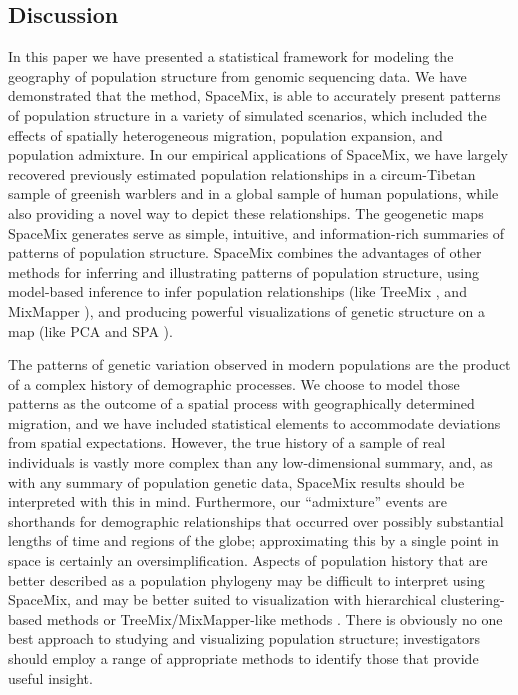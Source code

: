 \documentclass[12pt]{article}
\begin{document}
\subsection*{Discussion}
In this paper we have presented a statistical framework for modeling the geography of population structure from genomic sequencing data.
We have demonstrated that the method, SpaceMix, is able to accurately present patterns of population structure in a variety of simulated scenarios, which included the effects of spatially heterogeneous migration, population expansion, and population admixture.  In our empirical applications of SpaceMix, we have largely recovered previously estimated population relationships in a circum-Tibetan sample of greenish warblers and in a global sample of human populations, while also providing a novel way to depict these relationships.  The geogenetic maps SpaceMix generates serve as simple, intuitive, and information-rich summaries of patterns of population structure. 
SpaceMix combines the advantages of other methods for inferring and illustrating patterns of population structure, 
using model-based inference to infer population relationships (like TreeMix \citep{Treemix}, and MixMapper \citep{lipson_mixmapper_2013}), 
and producing powerful visualizations of genetic structure on a map (like PCA \citep{Patterson2006} and SPA \citep{yang_spatial_2014}).

The patterns of genetic variation observed in modern populations are the product of a complex history of demographic processes.  We choose to model those patterns as the outcome of a spatial process with geographically determined migration,
and we have included statistical elements to accommodate deviations from spatial expectations.
However, the true history of a sample of real individuals is vastly more complex than any low-dimensional summary,
and, as with any summary of population genetic data, 
SpaceMix results should be interpreted with this in mind.
Furthermore, our ``admixture'' events are shorthands for demographic relationships
that occurred over possibly substantial lengths of time and regions of the globe;
approximating this by a single point in space is certainly an oversimplification.
Aspects of population history that are better described as a population phylogeny may be difficult to interpret using SpaceMix,
and may be better suited to visualization with hierarchical clustering-based methods \citep{STRUCTURE} or TreeMix/MixMapper-like methods \citep{Treemix,lipson_mixmapper_2013}.  
There is obviously no one best approach to studying and visualizing population structure;
investigators should employ a range of appropriate methods to identify those that provide useful insight. 
\end{document}

